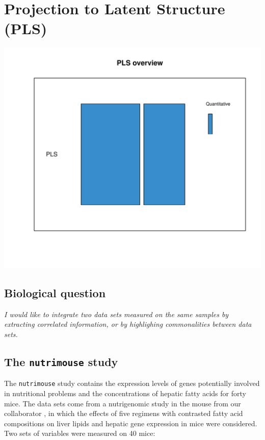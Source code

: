 \documentclass[]{book}
\begin{document}
\hypertarget{pls}{%
\chapter{Projection to Latent Structure (PLS)}\label{pls}}

\begin{center}\includegraphics[width=0.5\linewidth,]{Figures/05-overview-PLS-1} \end{center}

\hypertarget{biological-question-3}{%
\section{Biological question}\label{biological-question-3}}

{
\emph{I would like to integrate two data sets measured on the same samples by extracting correlated information, or by highlighing commonalities between data sets.}
}

\hypertarget{the-nutrimouse-study}{%
\section{\texorpdfstring{The \texttt{nutrimouse} study}{The nutrimouse study}}\label{the-nutrimouse-study}}

The \texttt{nutrimouse} study contains the expression levels of genes potentially involved in nutritional problems and the concentrations of hepatic fatty acids for forty mice. The data sets come from a nutrigenomic study in the mouse from our collaborator \citep{Mar07}, in which the effects of five regimens with contrasted fatty acid compositions on liver lipids and hepatic gene expression in mice were considered. Two sets of variables were measured on 40 mice:
\end{document}
